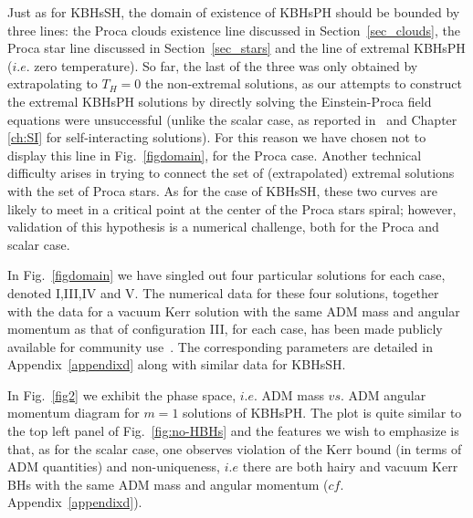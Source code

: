 Just as for KBHsSH, the domain of existence of KBHsPH should be bounded by three lines: the Proca clouds existence line discussed in Section~\ref{sec_clouds}, the Proca star line discussed in Section~\ref{sec_stars} and the line of extremal KBHsPH ($i.e.$ zero temperature).
So far, the last of the three was only obtained by extrapolating to $T_H=0$ the non-extremal solutions, as our attempts to construct the extremal KBHsPH solutions by directly solving the Einstein-Proca field equations were unsuccessful (unlike the scalar case, as reported in~\cite{Herdeiro:2015gia} and Chapter \ref{ch:SI} for self-interacting solutions).
For this reason we have chosen not to display this line in Fig.~\ref{figdomain}, for the Proca case.
Another technical difficulty arises in trying to connect the set of (extrapolated) extremal solutions with the set of Proca stars.
As for the case of KBHsSH, these two curves are likely to meet in a critical point at the center of the 
Proca stars spiral; however, validation of this hypothesis is a numerical challenge, both for the Proca and scalar case.

In Fig.~\ref{figdomain} we have singled out four particular solutions for each case, denoted I,III,IV and V. The numerical data for these four solutions, together with the data for a vacuum Kerr solution with the same ADM mass and angular momentum as that of configuration III, for each case, has been made publicly available for community use~\cite{datakbhph,datakbhsh}.
The corresponding parameters are detailed in Appendix~\ref{appendixd} along with similar data for KBHsSH.

In Fig.~\ref{fig2} we exhibit the phase space, $i.e.$ ADM mass $vs.$ ADM angular momentum diagram for $m=1$ solutions of KBHsPH.
The plot is quite similar to the top left panel of Fig.~\ref{fig:no-HBHs} and the features we wish to emphasize is that, as for the scalar case, one observes violation of the Kerr bound (in terms of ADM quantities) and non-uniqueness, $i.e$ there are both hairy and vacuum Kerr BHs with the same ADM mass and angular momentum ($cf.$ Appendix~\ref{appendixd}). 


